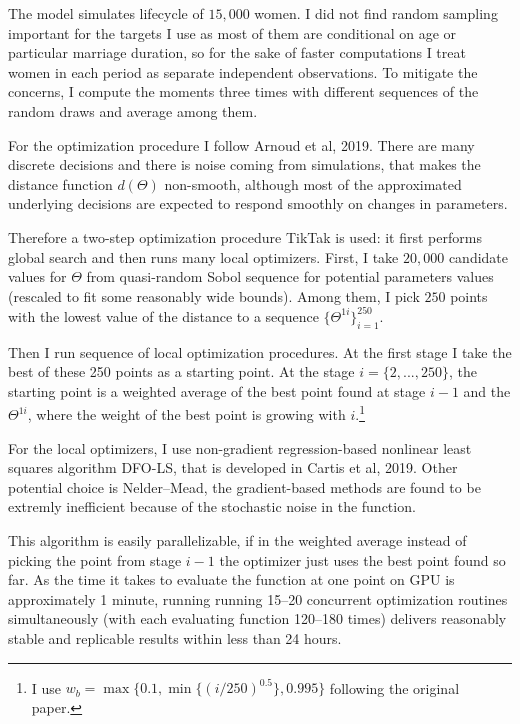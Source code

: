 \documentclass[12pt,letter]{article}
\begin{document}
The model simulates lifecycle of $15{,}000$ women. I did not find random sampling important for the targets I use as most of them are conditional on age or particular marriage duration, so for the sake of faster computations I treat women in each period as separate independent observations. To mitigate the concerns, I compute the moments three times with different sequences of the random draws and average among them.

For the optimization procedure I follow Arnoud et al, 2019\nocite{arnoud2019benchmarking}. There are many discrete decisions and there is noise coming from simulations, that makes the distance function $d(\Theta)$ non-smooth, although most of the approximated underlying decisions are expected to respond smoothly on changes in parameters. 

Therefore a two-step optimization procedure TikTak is used: it first performs global search and then runs many local optimizers. First, I take $20{,}000$ candidate values for $\Theta$ from quasi-random Sobol sequence for potential parameters values (rescaled to fit some reasonably wide bounds). Among them, I pick $250$ points with the lowest value of the distance to a sequence $\{\Theta^{1i}\}_{i=1}^{250}$.

Then I run sequence of local optimization procedures. At the first stage I take the best of these 250 points as a starting point. At the stage $i = \{2,...,250\}$, the starting point is a weighted average of the best point found at stage $i-1$ and the $\Theta^{1i}$, where the weight of the best point is growing with $i$.\footnote{I use $w_b = \max\{0.1,\min\{(i/250)^{0.5}\},0.995\}$ following the original paper.}

For the local optimizers, I use non-gradient regression-based nonlinear least squares algorithm DFO-LS, that is developed in Cartis et al, 2019\nocite{dfols}. Other potential choice is Nelder--Mead, the gradient-based methods are found to be extremly inefficient because of the stochastic noise in the function.

This algorithm is easily parallelizable, if in the weighted average instead of picking the point from stage $i-1$ the optimizer just uses the best point found so far. As the time it takes to evaluate the function at one point on GPU is approximately 1 minute, running running 15--20 concurrent optimization routines simultaneously (with each evaluating function 120--180 times) delivers reasonably stable and replicable results within less than 24 hours.
\end{document}
